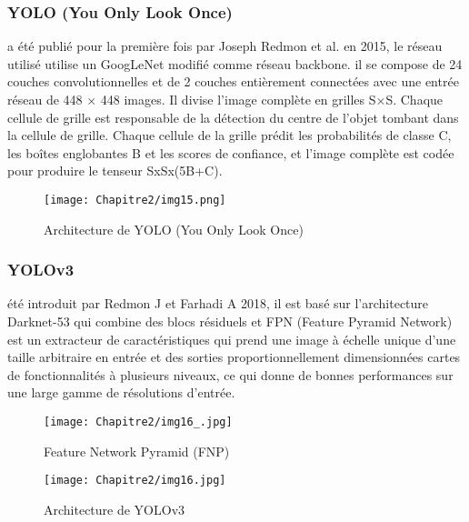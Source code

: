      \subsubsection{YOLO (You Only Look Once)} \cite{yolo_paper}
     a été publié pour la première fois par Joseph Redmon et al. en 2015, le réseau utilisé utilise un GoogLeNet modifié comme réseau backbone. il se compose de 24 couches convolutionnelles et de 2 couches entièrement connectées avec une entrée réseau de 448 × 448 images. Il divise l'image complète en grilles S×S. Chaque cellule de grille est responsable de la détection du centre de l'objet tombant dans la cellule de grille. Chaque cellule de la grille prédit les probabilités de classe C, les boîtes englobantes B et les scores de confiance, et l'image complète est codée pour produire le tenseur SxSx(5B+C).
     \begin{figure}[H]
          \centering
          \texttt{[image: Chapitre2/img15.png]}
          \caption{Architecture de YOLO (You Only Look Once)}
          \label{img15}
          \end{figure}

     \subsubsection{YOLOv3} \cite{yolov3_paper}
     été introduit par Redmon J et Farhadi A 2018, il est basé sur l'architecture Darknet-53 qui combine des blocs résiduels et FPN (Feature Pyramid Network) est un extracteur de caractéristiques qui prend une image à échelle unique d'une taille arbitraire en entrée et des sorties proportionnellement dimensionnées cartes de fonctionnalités à plusieurs niveaux, ce qui donne de bonnes performances sur une large gamme de résolutions d'entrée.
     \begin{figure}[H]
          \centering
          \texttt{[image: Chapitre2/img16\_.jpg]}
          \caption{Feature Network Pyramid (FNP)}
          \label{img16_}
          \end{figure}
     \begin{figure}[H]
          \centering
          \texttt{[image: Chapitre2/img16.jpg]}
          \caption{Architecture de YOLOv3}
          \label{img16}
          \end{figure}
     
          
